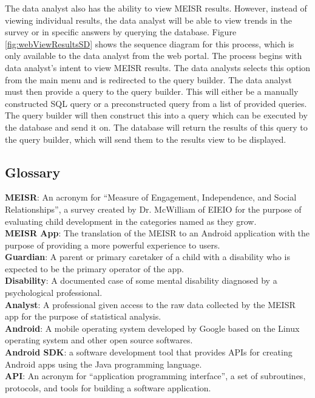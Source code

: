 	The data analyst also has the ability to view MEISR results. However, instead of viewing individual results, the data analyst will be able to view trends in the survey or in specific answers by querying the database. Figure \ref{fig:webViewResultsSD} shows the sequence diagram for this process, which is only available to the data analyst from the web portal. The process begins with data analyst's intent to view MEISR results. The data analysts selects this option from the main menu and is redirected to the query builder. The data analyst must then provide a query to the query builder. This will either be a manually constructed SQL query or a preconstructed query from a list of provided queries. The query builder will then construct this into a query which can be executed by the database and send it on. The database will return the results of this query to the query builder, which will send them to the results view to be displayed.

\begin{appendices}
\chapter{Glossary}
\textbf{MEISR}: An acronym for “Measure of Engagement, Independence, and Social Relationships”, a survey created by Dr. McWilliam of EIEIO for the purpose of evaluating child development in the categories named as they grow.\\
\textbf{MEISR App}: The translation of the MEISR to an Android application with the purpose of providing a more powerful experience to users.\\
\textbf{Guardian}: A parent or primary caretaker of a child with a disability who is expected to be the primary operator of the app.\\
\textbf{Disability}: A documented case of some mental disability diagnosed by a psychological professional.\\
\textbf{Analyst}: A professional given access to the raw data collected by the MEISR app for the purpose of statistical analysis.\\
\textbf{Android}: A mobile operating system developed by Google based on the Linux operating system and other open source softwares.\\
\textbf{Android SDK}: a software development tool that provides APIs for creating Android apps using the Java programming language.\\
\textbf{API}: An acronym for “application programming interface”, a set of subroutines, protocols, and tools for building a software application.\\
\end{appendices}


